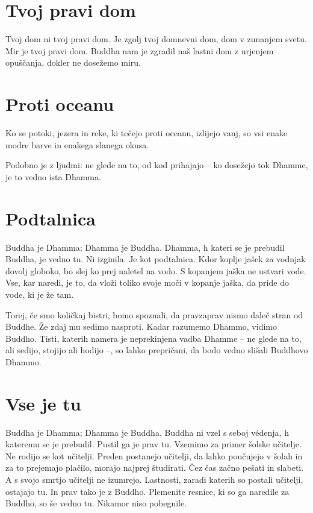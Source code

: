 
\section{Tvoj pravi dom}

Tvoj dom ni tvoj pravi dom. Je zgolj tvoj domnevni dom, dom v zunanjem svetu. Mir je tvoj pravi dom. Buddha nam je zgradil naš lastni dom z urjenjem opuščanja, dokler ne dosežemo miru.

\section{Proti oceanu}

Ko se potoki, jezera in reke, ki tečejo proti oceanu, izlijejo vanj, so vsi enake modre barve in enakega slanega okusa.

Podobno je z ljudmi: ne glede na to, od kod prihajajo – ko dosežejo tok Dhamme, je to vedno ista Dhamma.

\section{Podtalnica}

Buddha je Dhamma; Dhamma je Buddha. Dhamma, h kateri se je prebudil Buddha, je vedno tu. Ni izginila. Je kot podtalnica. Kdor koplje jašek za vodnjak dovolj globoko, bo slej ko prej naletel na vodo. S kopanjem jaška ne ustvari vode. Vse, kar naredi, je to, da vloži toliko svoje moči v kopanje jaška, da pride do vode, ki je že tam.

Torej, če smo količkaj bistri, bomo spoznali, da pravzaprav nismo daleč stran od Buddhe. Že zdaj mu sedimo nasproti. Kadar razumemo Dhammo, vidimo Buddho. Tisti, katerih namera je neprekinjena vadba Dhamme – ne glede na to, ali sedijo, stojijo ali hodijo –, so lahko prepričani, da bodo vedno slišali Buddhovo Dhammo.

\section{Vse je tu}

Buddha je Dhamma; Dhamma je Buddha. Buddha ni vzel s seboj védenja, h kateremu se je prebudil. Pustil ga je prav tu. Vzemimo za primer šolske učitelje. Ne rodijo se kot učitelji. Preden postanejo učitelji, da lahko poučujejo v šolah in za to prejemajo plačilo, morajo najprej študirati. Čez čas začno pešati in slabeti. A s svojo smrtjo učitelji ne izumrejo. Lastnosti, zaradi katerih so postali učitelji, ostajajo tu. In prav tako je z Buddho. Plemenite resnice, ki so ga naredile za Buddho, so še vedno tu. Nikamor niso pobegnile.

